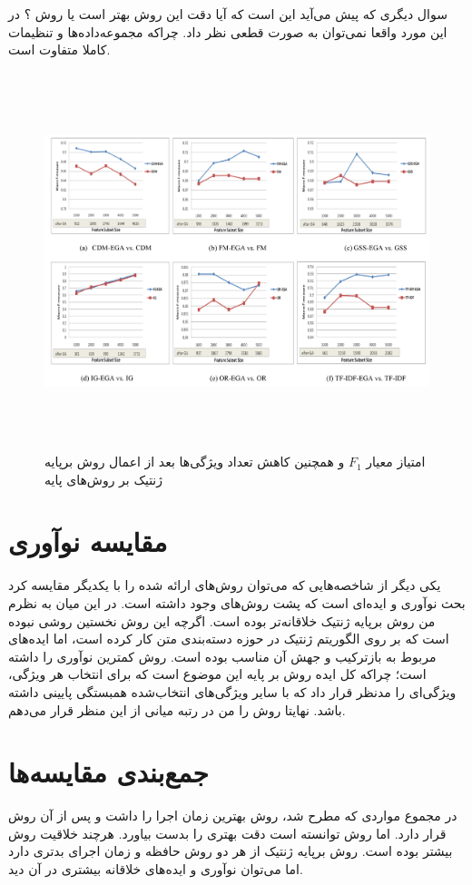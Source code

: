 سوال دیگری که پیش می‌آید این است که آیا دقت این روش بهتر است یا روش ؟ در این مورد واقعا نمی‌توان به صورت قطعی نظر داد. چراکه مجموعه‌داده‌ها و تنظیمات کاملا متفاوت است.

\begin{figure}[!h]
\includegraphics[height=11cm]{EGA1.png}
\caption{امتیاز معیار $F_1$ و همچنین کاهش تعداد ویژگی‌ها بعد از اعمال روش برپایه ژنتیک بر روش‌های پایه \cite{ghareb2016hybrid} }
\end{figure}

\section{مقایسه نوآوری}
یکی دیگر از شاخصه‌هایی که می‌توان روش‌های ارائه شده را با یکدیگر مقایسه کرد بحث نوآوری و ایده‌ای است که پشت روش‌های وجود داشته است. در این میان به نظرم من روش برپایه ژنتیک خلاقانه‌تر بوده است. اگرچه این روش نخستین روشی نبوده است که بر روی الگوریتم ژنتیک در حوزه دسته‌بندی متن کار کرده است\cite{ghareb2016hybrid}، اما ایده‌های مربوط به بازترکیب و جهش آن مناسب بوده است. روش  کمترین نوآوری را داشته است؛ چراکه کل ایده روش بر پایه این موضوع است که برای انتخاب هر ویژگی، ویژگی‌ای را مدنظر قرار داد که با سایر ویژگی‌های انتخاب‌شده همبستگی پایینی داشته باشد. نهایتا روش  را من در رتبه میانی از این منظر قرار می‌دهم.

\section{جمع‌بندی مقایسه‌ها}
در مجموع مواردی که مطرح شد، روش  بهترین زمان اجرا را داشت و پس از آن روش  قرار دارد. اما روش  توانسته است دقت بهتری را بدست بیاورد. هرچند خلاقیت روش  بیشتر بوده است. روش برپایه ژنتیک از هر دو روش حافظه و زمان اجرای بدتری دارد اما می‌توان نوآوری و ایده‌های خلاقانه بیشتری در آن دید. 